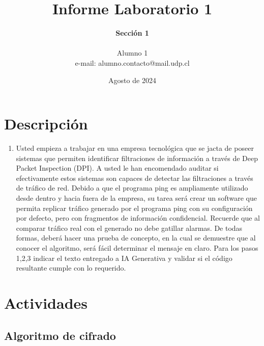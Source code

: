 \documentclass[letter,12pt]{article}
\begin{document}
%
   \title{\Huge{Informe Laboratorio 1}}

   \author{\textbf{Sección 1} \\  \\Alumno 1 \\ e-mail: alumno.contacto@mail.udp.cl}
          
   \date{Agosto de 2024}

   \maketitle
   
   \tableofcontents
 
  \newpage
  

\section{Descripción}

\begin{enumerate}
    \item  Usted empieza a trabajar en una empresa tecnológica que se jacta de poseer sistemas que permiten identificar filtraciones de información a través de Deep Packet Inspection (DPI).
    A usted le han encomendado auditar si efectivamente estos sistemas son capaces de detectar las filtraciones a través de tráfico de red. Debido a que el programa ping es ampliamente utilizado desde dentro y hacia fuera de la empresa, su tarea será crear un software que permita replicar tráfico generado por el programa ping con su configuración por defecto, pero con fragmentos de información confidencial. Recuerde que al comparar tráfico real con el generado no debe gatillar alarmas.
    De todas formas, deberá hacer una prueba de concepto, en la cual se demuestre que al conocer el algoritmo, será fácil determinar el mensaje en claro.
    Para los pasos 1,2,3 indicar el texto entregado a IA Generativa y validar si el código resultante cumple con lo requerido.


\end{enumerate}


\section{Actividades}


\subsection{Algoritmo de cifrado}
\end{document}
